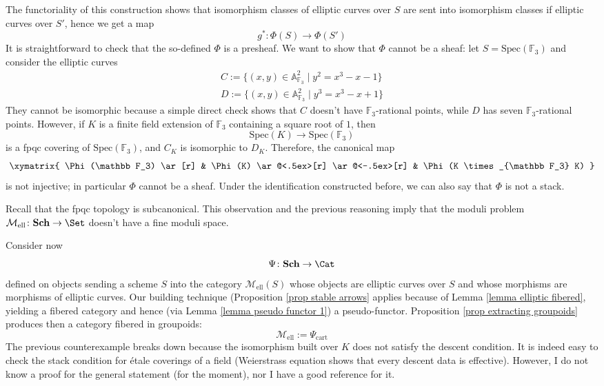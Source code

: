 The functoriality of this construction shows that isomorphism classes of elliptic curves over $S$ are sent into isomorphism classes if elliptic curves over $S'$, hence we get a map
\[
g^* \colon \Phi(S) \to \Phi(S')
\]
It is straightforward to check that the so-defined $\Phi$ is a presheaf. We want to show that $\Phi$ cannot be a sheaf: let $S = \mathrm{Spec}(\mathbb F_3)$ and consider the elliptic curves
\begin{gather*}
C := \{(x,y) \in \mathbb A^2_{\mathbb F_3} \mid y^2 = x^3 - x - 1 \} \\
D := \{(x,y) \in \mathbb A^2_{\mathbb F_3} \mid y^3 = x^3 - x + 1 \}
\end{gather*}
They cannot be isomorphic because a simple direct check shows that $C$ doesn't have $\mathbb F_3$-rational points, while $D$ has seven $\mathbb F_3$-rational points. However, if $K$ is a finite field extension of $\mathbb F_3$ containing a square root of $1$, then
\[
\mathrm{Spec}(K) \to \mathrm{Spec}(\mathbb F_3)
\]
is a fpqc covering of $\mathrm{Spec}(\mathbb F_3)$, and $C_K$ is isomorphic to $D_K$. Therefore, the canonical map
\[
\xymatrix{
\Phi(\mathbb F_3) \ar[r] & \Phi(K) \ar@<.5ex>[r] \ar@<-.5ex>[r] & \Phi(K \times_{\mathbb F_3} K)
}
\]
is not injective; in particular $\Phi$ cannot be a sheaf. Under the identification constructed before, we can also say that $\Phi$ is not a stack.

\begin{rmk}
Recall that the fpqc topology is subcanonical. This observation and the previous reasoning imply that the moduli problem $\mathcal M_{\mathrm{ell}} \colon \mathbf{Sch} \to \Set$ doesn't have a fine moduli space.
\end{rmk}

Consider now
\[
\Psi \colon \mathbf{Sch} \to \Cat
\]
defined on objects sending a scheme $S$ into the category $\mathcal M_{\mathrm{ell}}(S)$ whose objects are elliptic curves over $S$ and whose morphisms are morphisms of elliptic curves. Our building technique (Proposition \ref{prop stable arrows} applies because of Lemma \ref{lemma elliptic fibered}, yielding a fibered category and hence (via Lemma \ref{lemma pseudo functor 1}) a pseudo-functor. Proposition \ref{prop extracting groupoids} produces then a category fibered in groupoids:
\[
\mathcal M_{\mathrm{ell}} := \Psi_{\mathrm{cart}}
\]
The previous counterexample breaks down because the isomorphism built over $K$ does not satisfy the descent condition. It is indeed easy to check the stack condition for étale coverings of a field (Weierstrass equation shows that every descent data is effective). However, I do not know a proof for the general statement (for the moment), nor I have a good reference for it.

